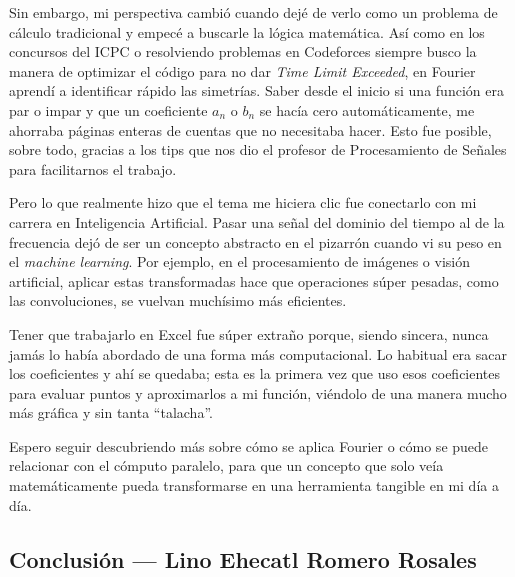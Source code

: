 Sin embargo, mi perspectiva cambió cuando dejé de verlo como un problema de cálculo tradicional y empecé a buscarle la lógica matemática. Así como en los concursos del ICPC o resolviendo problemas en Codeforces siempre busco la manera de optimizar el código para no dar \textit{Time Limit Exceeded}, en Fourier aprendí a identificar rápido las simetrías. Saber desde el inicio si una función era par o impar y que un coeficiente $a_n$ o $b_n$ se hacía cero automáticamente, me ahorraba páginas enteras de cuentas que no necesitaba hacer. Esto fue posible, sobre todo, gracias a los tips que nos dio el profesor de Procesamiento de Señales para facilitarnos el trabajo.

Pero lo que realmente hizo que el tema me hiciera clic fue conectarlo con mi carrera en Inteligencia Artificial. Pasar una señal del dominio del tiempo al de la frecuencia dejó de ser un concepto abstracto en el pizarrón cuando vi su peso en el \textit{machine learning}. Por ejemplo, en el procesamiento de imágenes o visión artificial, aplicar estas transformadas hace que operaciones súper pesadas, como las convoluciones, se vuelvan muchísimo más eficientes.

Tener que trabajarlo en Excel fue súper extraño porque, siendo sincera, nunca jamás lo había abordado de una forma más computacional. Lo habitual era sacar los coeficientes y ahí se quedaba; esta es la primera vez que uso esos coeficientes para evaluar puntos y aproximarlos a mi función, viéndolo de una manera mucho más gráfica y sin tanta ``talacha''.

Espero seguir descubriendo más sobre cómo se aplica Fourier o cómo se puede relacionar con el cómputo paralelo, para que un concepto que solo veía matemáticamente pueda transformarse en una herramienta tangible en mi día a día.

\clearpage

\subsection{Conclusión — Lino Ehecatl Romero Rosales}
\label{sec:cap01:conclusiones:lino}

